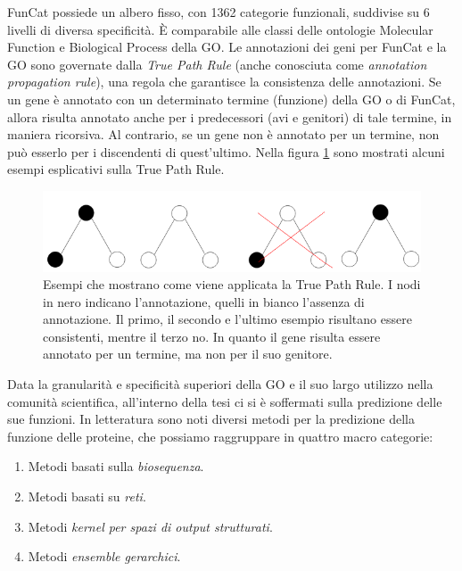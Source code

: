 \documentclass[12pt]{report}
\begin{document}
FunCat possiede un albero fisso, con 1362 categorie funzionali, suddivise su 6 livelli di diversa specificità. È comparabile alle classi delle ontologie Molecular Function e Biological Process della GO.
\newline
\newline
Le annotazioni dei geni per FunCat e la GO sono governate dalla \emph{True Path Rule} (anche conosciuta come \emph{annotation propagation rule})\cite{TOPDOWN}, una regola che garantisce la consistenza delle annotazioni. Se un gene è annotato con un determinato termine (funzione) della GO o di FunCat, allora risulta annotato anche per i predecessori (avi e genitori) di tale termine, in maniera ricorsiva. Al contrario, se un gene non è annotato per un termine, non può esserlo per i discendenti di quest'ultimo. Nella figura \ref{tpr_ex} sono mostrati alcuni esempi esplicativi sulla True Path Rule.
\newline
\begin{figure}[h]
\center
\includegraphics[scale=0.55]{./images/tpr_rule.png}
\caption{\footnotesize{Esempi che mostrano come viene applicata la True Path Rule. I nodi in nero indicano l'annotazione, quelli in bianco l'assenza di annotazione. Il primo, il secondo e l'ultimo esempio risultano essere consistenti, mentre il terzo no. In quanto il gene risulta essere annotato per un termine, ma non per il suo genitore.}}
\label{tpr_ex}
\end{figure}
\newline
Data la granularità e specificità superiori della GO e il suo largo utilizzo nella comunità scientifica, all'interno della tesi ci si è soffermati sulla predizione delle sue funzioni.
\newline
\newline
In letteratura sono noti diversi metodi per la predizione della funzione delle proteine\cite{valentiniMethods}, che possiamo raggruppare in quattro macro categorie:
\begin{enumerate}
\item Metodi basati sulla \emph{biosequenza}.
\item Metodi basati su \emph{reti}.
\item Metodi \emph{kernel per spazi di output strutturati}.
\item Metodi \emph{ensemble gerarchici}.
\end{enumerate}
\end{document}
